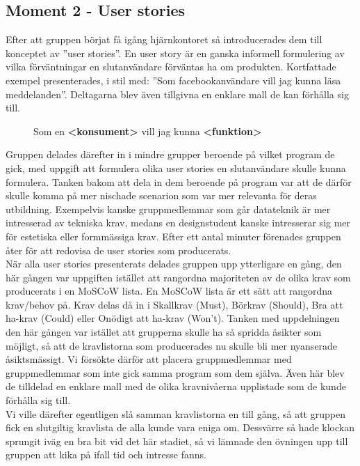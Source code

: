 \documentclass[a4paper, titlepage,12pt]{article}
\begin{document}
		\subsection{Moment 2 - User stories}
			Efter att gruppen börjat få igång hjärnkontoret så introducerades dem till konceptet av ''user stories''. En user story är en ganska informell formulering av vilka förväntningar en slutanvändare förväntas ha om produkten. Kortfattade exempel presenterades, i stil med: ''Som facebookanvändare vill jag kunna läsa meddelanden''. Deltagarna blev även tillgivna en enklare mall de kan förhålla sig till.

			\begin{figure}[h!]
				\begin{center}
				Som en \textbf{<konsument>} vill jag kunna \textbf{<funktion>}
				\end{center}
			\end{figure}

			Gruppen delades därefter in i mindre grupper beroende på vilket program de gick, med uppgift att formulera olika user stories en slutanvändare skulle kunna formulera. Tanken bakom att dela in dem beroende på program var att de därför skulle komma på mer nischade scenarion som var mer relevanta för deras utbildning. Exempelvis kanske gruppmedlemmar som går datateknik är mer intresserad av tekniska krav, medans en designstudent kanske intresserar sig mer för estetiska eller formmässiga krav. Efter ett antal minuter förenades gruppen åter för att redovisa de user stories som producerats.\\

			När alla user stories presenterats delades gruppen upp ytterligare en gång, den här gången var uppgiften istället att rangordna majoriteten av de olika krav som producerats i en MoSCoW lista. En MoSCoW lista är ett sätt att rangordna krav/behov på. Krav delas då in i Skallkrav (Must), Börkrav (Should), Bra att ha-krav (Could) eller Onödigt att ha-krav (Won't). Tanken med uppdelningen den här gången var istället att grupperna skulle ha så spridda åsikter som möjligt, så att de kravlistorna som producerades nu skulle bli mer nyanserade åsiktsmässigt. Vi försökte därför att placera gruppmedlemmar med gruppmedlemmar som inte gick samma program som dem själva. Även här blev de tilldelad en enklare mall med de olika kravnivåerna upplistade som de kunde förhålla sig till.\\

			Vi ville därefter egentligen slå samman kravlistorna en till gång, så att gruppen fick en slutgiltig kravlista de alla kunde vara eniga om. Dessvärre så hade klockan sprungit iväg en bra bit vid det här stadiet, så vi lämnade den övningen upp till gruppen att kika på ifall tid och intresse fanns.
\end{document}
